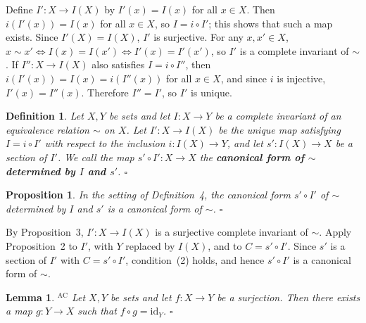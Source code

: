 \documentclass{article}
\makeatletter
\theoremstyle{noperiod}
\newtheorem{definition}{Definition}
\newtheorem{proposition}{Proposition}
\newtheorem{lemma}{Lemma}
\renewenvironment{proof}[1][\proofname]{\par
  \pushQED{\qed}
  \normalfont \topsep6\p@\@plus6\p@\relax
  \trivlist
  \item[\hskip\labelsep
        \itshape
    #1 ]\ignorespaces
}{
  \popQED\endtrivlist\@endpefalse
}
\renewcommand{\proofname}{\bfseries Proof}
\makeatother
\begin{document}
\begin{proof}
Define $I' \colon X \to I(X)$ by $I'(x) = I(x)$ for all $x \in X$. Then
$i(I'(x)) = I(x)$ for all $x \in X$, so $I = i \circ I'$; this shows that such
a map exists. Since $I'(X) = I(X)$, $I'$ is surjective. For any $x, x' \in X$,
$x \sim x' \iff I(x) = I(x') \iff I'(x) = I'(x')$,
so $I'$ is a complete invariant of $\sim$. If $I'' \colon X \to I(X)$ also
satisfies $I = i \circ I''$, then $i(I'(x)) = I(x) = i(I''(x))$ for all
$x \in X$, and since $i$ is injective, $I'(x) = I''(x)$. Therefore $I'' = I'$,
so $I'$ is unique.
\end{proof}

\begin{definition}
Let $X, Y$ be sets and let $I \colon X \to Y$ be a complete invariant of an
equivalence relation $\sim$ on $X$. Let $I' \colon X \to I(X)$ be the unique
map satisfying $I = i \circ I'$ with respect to the inclusion
$i \colon I(X) \to Y$, and let $s' \colon I(X) \to X$ be a section of $I'$.
We call the map $s' \circ I' \colon X \to X$ the \textbf{canonical form of
$\sim$ determined by $I$ and $s'$}.
\hfill $\square$
\end{definition}

\begin{proposition}
In the setting of Definition~4, the canonical form $s' \circ I'$ of $\sim$
determined by $I$ and $s'$ is a canonical form of $\sim$.
\hfill $\square$
\end{proposition}

\begin{proof}
By Proposition~3, $I' \colon X \to I(X)$ is a surjective complete invariant of
$\sim$. Apply Proposition~2 to $I'$, with $Y$ replaced by $I(X)$, and to
$C = s' \circ I'$. Since $s'$ is a section of $I'$ with $C = s' \circ I'$,
condition~(2) holds, and hence $s' \circ I'$ is a canonical form of $\sim$.
\end{proof}

\begin{lemma}\hspace{-0.7em}$^{\textrm{AC}}$\hspace{0.2em}
Let $X, Y$ be sets and let $f \colon X \to Y$ be a surjection. Then there
exists a map $g \colon Y \to X$ such that $f \circ g = \mathrm{id}_Y$.
\hfill $\square$
\end{lemma}
\end{document}
